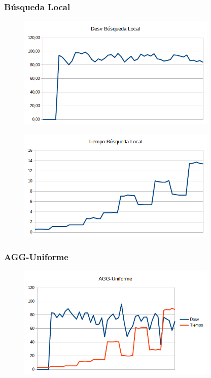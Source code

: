 \documentclass{article}
\begin{document}
    \pagebreak
    \subsubsection{Búsqueda Local}

    \begin{figure}[h]
        \centering
        \includegraphics[width=0.85\textwidth]{desvbl.png}
    \end{figure}

    \begin{figure}[h]
        \centering
        \includegraphics[width=0.85\textwidth]{tiempobl.png}
    \end{figure}

    \pagebreak
    \subsubsection{AGG-Uniforme}

    \begin{figure}[h]
        \centering
        \includegraphics[width=0.85\textwidth]{graficoAGGU.png}
    \end{figure}
\end{document}
